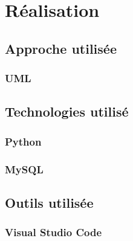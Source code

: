 \chapter{Réalisation}
\section{Approche utilisée}
\subsection{UML}
\lipsum[1-2]

\section{Technologies utilisé}
\subsection{Python}
\lipsum[1-2]

\subsection{MySQL}
\lipsum[1-2]

\section{Outils utilisée}
\lipsum[1-2]

\subsection{Visual Studio Code}
\lipsum[1-2]